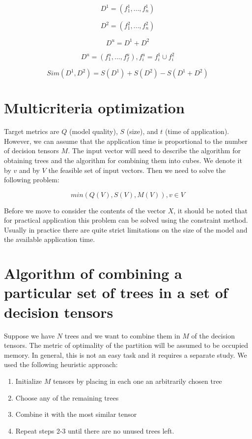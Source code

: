 \documentclass[a4paper]{jpconf}
\begin{document}
$$D^1 = (f^{1}_{1}, ..., f^{1}_{n})$$

$$D^2 = (f^{2}_{1}, ..., f^{2}_{n})$$

$$D^u = D^1 + D^2$$

$$D^u = (f^{u}_{1}, ..., f^{u}_{f}), f^{u}_{i} = f^{1}_{i} \cup f^{2}_{i}$$

$$Sim(D^1, D^2) = S(D^1) + S(D^2) - S(D^1 + D^2)$$

\section{Multicriteria optimization}

Target metrics are $ Q $ (model quality), $ S $ (size), and $ t $ (time of application). However, we can assume that the application time is proportional to the number of decision tensors $ M $.
The input vector will need to describe the algorithm for obtaining trees and the algorithm for combining them into cubes. We denote it by $ v $ and by $V$ the feasible set of input vectors. Then we need to solve the following problem:

$$min(Q(V), S(V), M(V)), v \in V$$

Before we move to consider the contents of the vector $ X $, it should be noted that for practical application this problem can be solved using the constraint method. Usually in practice there are quite strict limitations on the size of the model and the available application time.

\section{Algorithm of combining a particular set of trees in a set of decision tensors}

Suppose we have $N$ trees and we want to combine them in $M$ of the decision tensors. The metric of optimality of the partition will be assumed to be occupied memory.
In general, this is not an easy task and it requires a separate study. We used the following heuristic approach:
\medskip
\renewcommand{\theenumi}{\arabic{enumi}}
\begin{enumerate}
\item Initialize $M$ tensors by placing in each one an arbitrarily chosen tree
\item Choose any of the remaining trees
\item Combine it with the most similar tensor
\item Repeat steps 2-3 until there are no unused trees left.
\end{enumerate}
\end{document}
